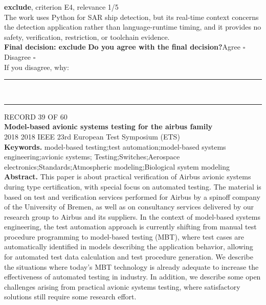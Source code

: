 \documentclass[11pt,a4paper]{article}
\begin{document}
{\small\textbf{exclude}, criterion E4, relevance 1/5}\\[0.5mm]
{\small The work uses Python for SAR ship detection, but its real-time context concerns the detection application rather than language-runtime timing, and it provides no safety, verification, restriction, or toolchain evidence.}\\[2.5mm]
{\small\textbf{Final decision: exclude}}
\vspace{2mm}
{\small\textbf{Do you agree with the final decision?}\quad{}Agree $\square$\qquad{}Disagree $\square$}\\[1mm]
{\footnotesize\color{soft}If you disagree, why:}\\[1mm]
\color{rule}\rule{\linewidth}{0.3pt}\\[3mm]\rule{\linewidth}{0.3pt}\color{black}
\clearpage
{\color{soft}\footnotesize RECORD 39 OF 60}\\[1mm]
{\large\bfseries Model-based avionic systems testing for the airbus family}\\[1.5mm]
{\color{soft}\small 2018 \textperiodcentered{} 2018 IEEE 23rd European Test Symposium (ETS)}\\[2mm]
{\small\textbf{Keywords.} model-based testing;test automation;model-based systems engineering;avionic systems; Testing;Switches;Aerospace electronics;Standards;Atmospheric modeling;Biological system modeling}\\[2mm]
{\small\textbf{Abstract.} This paper is about practical verification of Airbus avionic systems during type certification, with special focus on automated testing. The material is based on test and verification services performed for Airbus by a spinoff company of the University of Bremen, as well as on consultancy services delivered by our research group to Airbus and its suppliers. In the context of model-based systems engineering, the test automation approach is currently shifting from manual test procedure programming to model-based testing (MBT), where test cases are automatically identified in models describing the application behavior, allowing for automated test data calculation and test procedure generation. We describe the situations where today's MBT technology is already adequate to increase the effectiveness of automated testing in industry. In addition, we describe some open challenges arising from practical avionic systems testing, where satisfactory solutions still require some research effort.}
\vspace{3mm}
\end{document}
